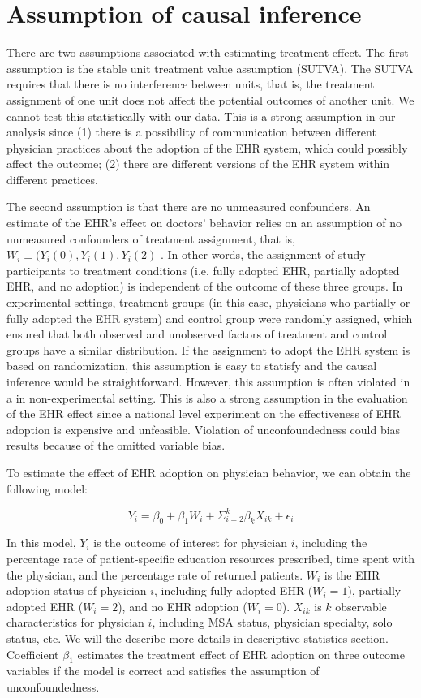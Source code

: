 \documentclass[12pt]{report}
\begin{document}
\section{Assumption of causal inference}
There are two assumptions associated with estimating treatment effect. The first assumption is the stable unit treatment value assumption (SUTVA). The SUTVA requires that there is no interference between units, that is, the treatment assignment of one unit does not affect the potential outcomes of another unit. We cannot test this statistically with our data. This is a strong assumption in our analysis since (1) there is a possibility of communication between different physician practices about the adoption of the EHR system, which could possibly affect the outcome; (2) there are different versions of the EHR system within different practices.

The second assumption is that there are no unmeasured confounders. An estimate of the EHR's effect on doctors' behavior relies on an assumption of no unmeasured confounders of treatment assignment, that is, $W_i \perp (Y_i(0),Y_i(1),Y_i(2)$ \citep{imbens2008recent}. In other words, the assignment of study participants to treatment conditions (i.e. fully adopted EHR, partially adopted EHR, and no adoption) is independent of the outcome of these three groups. In experimental settings, treatment groups (in this case, physicians who partially or fully adopted the EHR system) and control group were randomly assigned, which ensured that both observed and unobserved factors of treatment and control groups have a similar distribution. If the assignment to adopt the EHR system is based on randomization, this assumption is easy to statisfy and the causal inference would be straightforward. However, this assumption is often violated in a in non-experimental setting. This is also a strong assumption in the evaluation of the EHR effect since a national level experiment on the effectiveness of EHR adoption is expensive and unfeasible. Violation of unconfoundedness could bias results because of the omitted variable bias.

To estimate the effect of EHR adoption on physician behavior, we can obtain the following model:

\begin{equation*}
Y_{i} = \beta_0 + \beta_1 W_i + \Sigma^k_{i=2} \beta_k X_{ik} + \epsilon_{i}
\end{equation*}

In this model, $Y_{i}$ is the outcome of interest for physician $i$, including the percentage rate of patient-specific education resources prescribed, time spent with the physician, and the percentage rate of returned patients. $W_i$ is the EHR adoption status of physician $i$, including fully adopted EHR ($W_i=1$), partially adopted EHR ($W_i=2$), and no EHR adoption ($W_i=0$). $X_{ik}$ is $k$ observable characteristics for physician $i$, including MSA status, physician specialty, solo status, etc. We will the describe more details in descriptive statistics section. Coefficient $\beta_1$ estimates the treatment effect of EHR adoption on three outcome variables if the model is correct and satisfies the assumption of unconfoundedness. 
\end{document}
